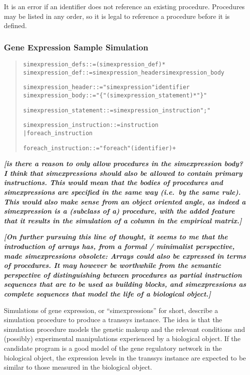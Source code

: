 \documentclass[a4paper,fleqn]{article}
\newcommand{\todo}[1]{\rule{0pt}{0pt}\marginpar{\rule{1ex}{1ex}}\textbf{\emph{[#1]}}}
\newenvironment{ebnfrule}{\begin{footnotesize}\begin{quote}\begin{alltt}}{\end{alltt}\end{quote}\end{footnotesize}}
\begin{document}
It is an error if an identifier does not reference an existing
procedure. Procedures may be listed in any order, so it is legal to
reference a procedure before it is defined.


\subsubsection{Gene Expression Sample Simulation}

\begin{ebnfrule}
simexpression_defs ::= (simexpression_def)*
simexpression_def ::= simexpression_header simexpression_body

simexpression_header ::= "simexpression" identifier 
simexpression_body ::= "\{" (simexpression_statement)* "\}"

simexpression_statement ::= simexpression_instruction ";"

simexpression_instruction ::= instruction
        | foreach_instruction

foreach_instruction ::= "foreach" (identifier)+

\end{ebnfrule}

\todo{is there a reason to only allow procedures in the simexpression
  body? I think that simexpressions should also be allowed to contain
  primary instructions. This would mean that the bodies of procedures
  and simexpressions are specified in the same way (i.e.\ by the same
  rule). This would also make sense from an object oriented angle, as
  indeed a simexpression \emph{is a} (subclass of a) procedure, with
  the added feature that it results in the simulation of a column in
  the empirical matrix.}

\todo{On further pursuing this line of thought, it seems to me that
  the introduction of arrays has, from a formal / minimalist
  perspective, made simexpressions obsolete: Arrays could also be
  expressed in terms of procedures. It may however be worthwhile from
  the semantic perspective of distinguishing between procedures as
  partial instruction sequences that are to be used as building
  blocks, and simexpressions as complete sequences that model the life
  of a biological object.}

Simulations of gene expression, or ``simexpressions'' for short,
describe a simulation procedure to produce a transsys instance. The
idea is that the simulation procedure models the genetic makeup and
the relevant conditions and (possibly) experimental manipulations
experienced by a biological object. If the candidate program is a good
model of the gene regulatory network in the biological object, the
expression levels in the transsys instance are expected to be similar
to those measured in the biological object.
\end{document}
